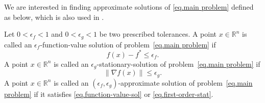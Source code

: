 \documentclass[moor,sglanonrev]{informs4}
\begin{document}
We are interested in finding approximate solutions of \eqref{eq.main problem} defined as below, which is also used in \citet{monteiro2013accelerated}.
{\color{red}
\begin{definition}
    \label{def.approximate solution}
    Let $0<\epsilon_f<1$ and $0<\epsilon_g<1$ be two prescribed tolerances. A point $x\in\mathbb{R}^n$ is called an
    $\epsilon_f$-function-value solution of problem~\eqref{eq.main problem} if
    \begin{equation}\label{eq.function-value-sol}
        f(x)-f^* \leq \epsilon_f.
    \end{equation}
    A point $x\in\mathbb{R}^n$ is called an
    $\epsilon_g$-stationary-solution of problem~\eqref{eq.main problem} if
    \begin{equation}\label{eq.first-order-stat}
        \|\nabla f(x)\| \leq \epsilon_g.
    \end{equation}
    A point $x\in\mathbb{R}^n$ is called an
    $(\epsilon_f,\epsilon_g)$-approximate solution of problem~\eqref{eq.main problem} if it satisfies \eqref{eq.function-value-sol} or \eqref{eq.first-order-stat}.
\end{definition}
}
\end{document}
